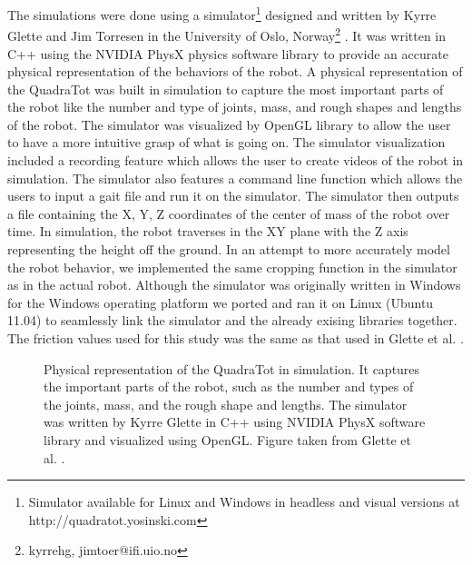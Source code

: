The simulations were done using a simulator\footnote{Simulator available for Linux and Windows in headless and visual versions at http://quadratot.yosinski.com} designed and written by Kyrre Glette and Jim Torresen in the University of Oslo, Norway\footnote{{kyrrehg, jimtoer}@ifi.uio.no} \cite{glette}. 
It was written in C++ using the NVIDIA PhysX physics software library to provide an accurate physical representation of the behaviors of the robot. 
A physical representation of the QuadraTot was built in simulation to capture the most important parts of the robot like the number and type of joints, mass, and rough shapes and lengths of the robot. 
The simulator was visualized by OpenGL library to allow the user to have a more intuitive grasp of what is going on. 
The simulator visualization included a recording feature which allows the user to create videos of the robot in simulation.
The simulator also features a command line function which allows the users to input a gait file and run it on the simulator. 
The simulator then outputs a file containing the X, Y, Z coordinates of the center of mass of the robot over time. 
In simulation, the robot traverses in the XY plane with the Z axis representing the height off the ground. 
In an attempt to more accurately model the robot behavior, we implemented the same cropping function in the simulator as in the actual robot. 
Although the simulator was originally written in Windows for the Windows operating platform we ported and ran it on Linux (Ubuntu 11.04) to seamlessly link the simulator and the already exising libraries together. 
The friction values used for this study was the same as that used in Glette et al. \cite{glette}. 
%
%

\begin{figure}
\begin{center}
\vspace{1cm}
\caption[ ]{Physical representation of the QuadraTot in simulation. It captures the important parts of the robot, such as the number and types of the joints, mass, and the rough shape and lengths. The simulator was written by Kyrre Glette in C++ using NVIDIA PhysX software library and visualized using OpenGL. Figure taken from Glette et al. \cite{glette}.}
\end{center}
\end{figure}
